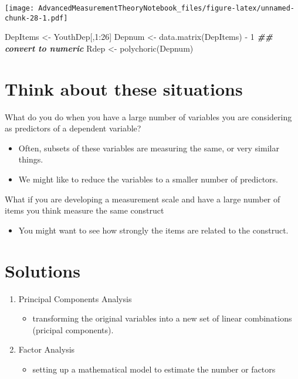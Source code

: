 \documentclass[
]{book}
\newenvironment{Shaded}{\begin{snugshade}}{\end{snugshade}}
\newcommand{\DecValTok}[1]{\textcolor[rgb]{0.00,0.00,0.81}{#1}}
\newcommand{\DocumentationTok}[1]{\textcolor[rgb]{0.56,0.35,0.01}{\textbf{\textit{#1}}}}
\newcommand{\FunctionTok}[1]{\textcolor[rgb]{0.00,0.00,0.00}{#1}}
\newcommand{\NormalTok}[1]{#1}
\newcommand{\OtherTok}[1]{\textcolor[rgb]{0.56,0.35,0.01}{#1}}
\newcommand{\SpecialCharTok}[1]{\textcolor[rgb]{0.00,0.00,0.00}{#1}}
\providecommand{\tightlist}{%
  \setlength{\itemsep}{0pt}\setlength{\parskip}{0pt}}
\begin{document}
\texttt{[image: AdvancedMeasurementTheoryNotebook\_files/figure-latex/unnamed-chunk-28-1.pdf]}

\begin{Shaded}
\begin{Highlighting}[]
\NormalTok{DepItems }\OtherTok{\textless{}{-}}\NormalTok{ YouthDep[,}\DecValTok{1}\SpecialCharTok{:}\DecValTok{26}\NormalTok{] }
\NormalTok{Depnum }\OtherTok{\textless{}{-}} \FunctionTok{data.matrix}\NormalTok{(DepItems) }\SpecialCharTok{{-}} \DecValTok{1}  \DocumentationTok{\#\# convert to numeric   }
\NormalTok{Rdep }\OtherTok{\textless{}{-}} \FunctionTok{polychoric}\NormalTok{(Depnum)}
\end{Highlighting}
\end{Shaded}

\hypertarget{think-about-these-situations}{%
\section{Think about these situations}\label{think-about-these-situations}}

What do you do when you have a large number of variables you are considering as predictors of a dependent variable?

\begin{itemize}
\tightlist
\item
  Often, subsets of these variables are measuring the same, or very similar things.
\item
  We might like to reduce the variables to a smaller number of predictors.
\end{itemize}

What if you are developing a measurement scale and have a large number of items you think measure the same construct

\begin{itemize}
\tightlist
\item
  You might want to see how strongly the items are related to the construct.
\end{itemize}

\hypertarget{solutions}{%
\section{Solutions}\label{solutions}}

\begin{enumerate}
\def\labelenumi{\arabic{enumi}.}
\item
  Principal Components Analysis

  \begin{itemize}
  \tightlist
  \item
    transforming the original variables into a new set of linear combinations (pricipal components).
  \end{itemize}
\item
  Factor Analysis

  \begin{itemize}
  \tightlist
  \item
    setting up a mathematical model to estimate the number or factors
  \end{itemize}
\end{enumerate}
\end{document}
